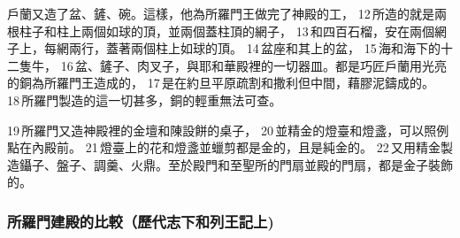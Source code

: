 戶蘭又造了盆、鏟、碗。這樣，他為所羅門王做完了神殿的工， 12 所造的就是兩根柱子和柱上兩個如球的頂，並兩個蓋柱頂的網子， 13 和四百石榴，安在兩個網子上，每網兩行，蓋著兩個柱上如球的頂。 14 盆座和其上的盆， 15 海和海下的十二隻牛， 16 盆、鏟子、肉叉子，與耶和華殿裡的一切器皿。都是巧匠戶蘭用光亮的銅為所羅門王造成的， 17 是在約旦平原疏割和撒利但中間，藉膠泥鑄成的。 18 所羅門製造的這一切甚多，銅的輕重無法可查。

19 所羅門又造神殿裡的金壇和陳設餅的桌子， 20 並精金的燈臺和燈盞，可以照例點在內殿前。 21 燈臺上的花和燈盞並蠟剪都是金的，且是純金的。 22 又用精金製造鑷子、盤子、調羹、火鼎。至於殿門和至聖所的門扇並殿的門扇，都是金子裝飾的。




\subsubsection{所羅門建殿的比較（歷代志下和列王記上)}
